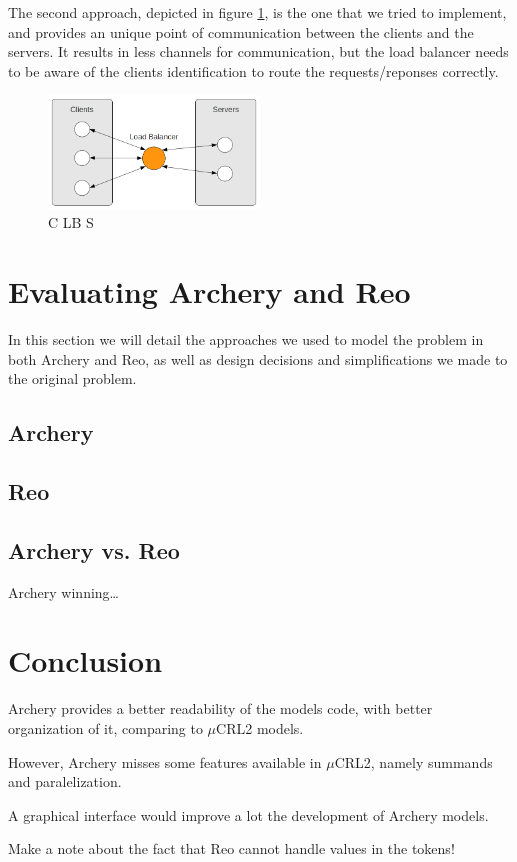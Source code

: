 \documentclass[a4paper]{article}
\newcommand{\ar}{Archery\xspace}
\newcommand{\re}{Reo\xspace}
\newcommand{\mcrl}{$\mu$CRL2\xspace}
\begin{document}
The second approach, depicted in figure \ref{fig:clbs}, is the one that we
tried to implement, and provides an unique point of communication between the
clients and the servers. It results in less channels for communication, but the
load balancer needs to be aware of the clients identification to route the
requests/reponses correctly.

\begin{figure}[htb]
	\begin{center}
		\includegraphics[width=0.5\textwidth]{images/c_lb_s.png}
	\end{center}
	\caption{C LB S}
	\label{fig:clbs}
\end{figure}



%
%
\section{Evaluating \ar and \re}

In this section we will detail the approaches we used to model the problem in
both \ar and \re, as well as design decisions and simplifications we made to the
original problem.



\subsection{\ar}


\subsection{\re}


\subsection{\ar vs. \re}

\ar winning\dots

%
%
\section{Conclusion}
\ar provides a better readability of the models code, with better organization of it,
comparing to \mcrl models.

However, \ar misses some features available in \mcrl, namely summands and paralelization.

A graphical interface would improve a lot the development of Archery models.

Make a note about the fact that \re cannot handle values in the tokens! %
\end{document}
